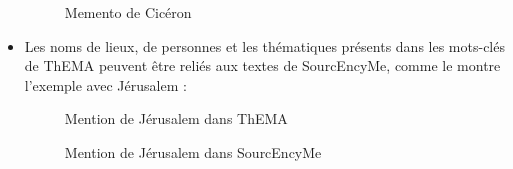 \begin{itemize}
	\begin{figure}[H]
		\centering
		\caption{Memento de Cicéron}
	\end{figure}
	
	\item Les noms de lieux, de personnes et les thématiques présents dans les mots-clés de ThEMA peuvent être reliés aux textes de SourcEncyMe, comme le montre l'exemple avec Jérusalem : \\
	
	\begin{figure}[H]
		\centering
		\caption{Mention de Jérusalem dans ThEMA}
	\end{figure}
	
	\begin{figure}[H]
		\centering
		\caption{Mention de Jérusalem dans SourcEncyMe}
	\end{figure}
	
\end{itemize}

